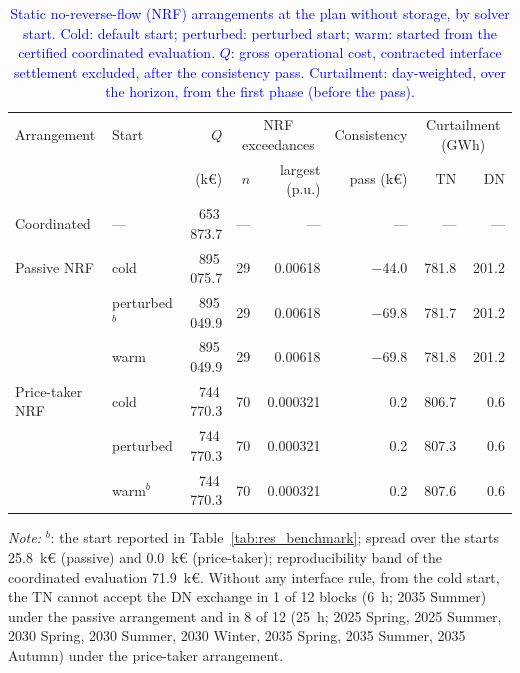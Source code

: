 \documentclass[preprint,12pt]{elsarticle}
\begin{document}
\begin{table}[htbp!]
    \centering
    \caption{\textcolor{blue}{Static no-reverse-flow (NRF) arrangements at the plan without storage, by solver start. Cold: default start; perturbed: perturbed start; warm: started from the certified coordinated evaluation. $Q$: gross operational cost, contracted interface settlement excluded, after the consistency pass. Curtailment: day-weighted, over the horizon, from the first phase (before the pass).}}
    \label{tab:appE_benchmark}
    \scriptsize\setlength{\tabcolsep}{4pt}
    \begin{tabular}{l l r r r r r r}
        \toprule
        Arrangement & Start & $Q$ & \multicolumn{2}{c}{NRF exceedances} & Consistency & \multicolumn{2}{c}{Curtailment (GWh)} \\
        \cmidrule(lr){4-5}\cmidrule(l){7-8}
         & & (k\euro) & $n$ & largest (p.u.) & pass (k\euro) & TN & DN \\
        \midrule
        Coordinated & --- & 653\,873.7 & --- & --- & --- & --- & --- \\
        \midrule
        Passive NRF & cold & 895\,075.7 & 29 & 0.00618 & $-$44.0 & 781.8 & 201.2 \\
         & perturbed$^{b}$ & 895\,049.9 & 29 & 0.00618 & $-$69.8 & 781.7 & 201.2 \\
         & warm & 895\,049.9 & 29 & 0.00618 & $-$69.8 & 781.8 & 201.2 \\
        \midrule
        Price-taker NRF & cold & 744\,770.3 & 70 & 0.000321 & 0.2 & 806.7 & 0.6 \\
         & perturbed & 744\,770.3 & 70 & 0.000321 & 0.2 & 807.3 & 0.6 \\
         & warm$^{b}$ & 744\,770.3 & 70 & 0.000321 & 0.2 & 807.6 & 0.6 \\
        \bottomrule
    \end{tabular}
    \par\smallskip
    \begin{minipage}{0.95\linewidth}
        \scriptsize\raggedright
        \textit{Note:} $^{b}$: the start reported in Table~\ref{tab:res_benchmark}; spread over the starts 25.8~k\euro{} (passive) and 0.0~k\euro{} (price-taker); reproducibility band of the coordinated evaluation 71.9~k\euro{}. Without any interface rule, from the cold start, the TN cannot accept the DN exchange in 1 of 12 blocks (6~h; 2035 Summer) under the passive arrangement and in 8 of 12 (25~h; 2025 Spring, 2025 Summer, 2030 Spring, 2030 Summer, 2030 Winter, 2035 Spring, 2035 Summer, 2035 Autumn) under the price-taker arrangement.
    \end{minipage}
\end{table}
\end{document}
